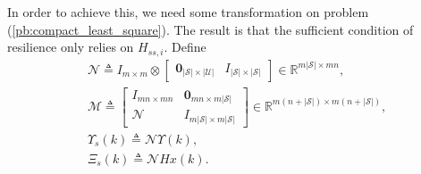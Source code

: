 \documentclass[journal]{IEEEtran}
\newcommand{\Rb}{{\mathbb{R}}}
\newcommand{\Uc}{{\mathcal{U}}}
\newcommand{\Sc}{{\mathcal{S}}}
\newcommand{\Mc}{{\mathcal{M}}}
\newcommand{\Nc}{{\mathcal{N}}}
\begin{document}
	In order to achieve this, we need some transformation on problem (\ref{pb:compact_least_square}). The result is that the sufficient condition of resilience only relies on $H_{ss,i}$.
	Define 
	\begin{align*}
		&\Nc\triangleq
		I_{m\times m} \otimes 
		\begin{bmatrix}
			\mathbf{0}_{|\Sc|\times|\Uc|} & I_{|\Sc|\times|\Sc|}
		\end{bmatrix}
		\in \Rb^{m|\Sc|\times mn },
		\\
		&\Mc\triangleq
		\begin{bmatrix}
			I_{mn\times mn} & \mathbf{0}_{mn\times m|\Sc|} \\ 
			\Nc		
			& I_{m|\Sc|\times m|\Sc|} 
		\end{bmatrix}
		\in \Rb^{m(n+|\Sc|)\times m(n+|\Sc|) },
		\\
		&\Upsilon_s(k) \triangleq\Nc\Upsilon (k), \\
		&\Xi_s(k) \triangleq\Nc H x(k).
	\end{align*}
	
\end{document}
